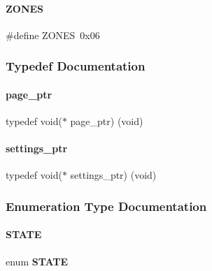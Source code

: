 \paragraph{Z\+O\+N\+ES}
{\footnotesize\ttfamily \#define Z\+O\+N\+ES~0x06}



\subsubsection{Typedef Documentation}
\mbox{\label{a00038_a40dbf358613f79e8e25bbdf11ca430ad}} 
\paragraph{page\+\_\+ptr}
{\footnotesize\ttfamily typedef void($\ast$ page\+\_\+ptr) (void)}

\mbox{\label{a00038_a003b40565e920dfcf369226a7d8d9e8c}} 
\paragraph{settings\+\_\+ptr}
{\footnotesize\ttfamily typedef void($\ast$ settings\+\_\+ptr) (void)}



\subsubsection{Enumeration Type Documentation}
\mbox{\label{a00038_a275a67132f10277ada3a0ee3d616b647}} 
\paragraph{S\+T\+A\+TE}
{\footnotesize\ttfamily enum \textbf{ S\+T\+A\+TE}}

